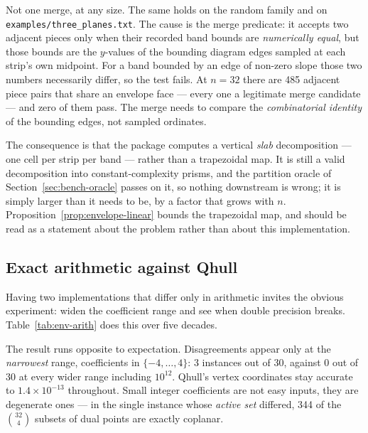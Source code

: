 \documentclass[11pt]{article}
\begin{document}
Not one merge, at any size.  The same holds on the random family and on
\texttt{examples/three\_planes.txt}.  The cause is the merge predicate: it
accepts two adjacent pieces only when their recorded band bounds are
\emph{numerically equal}, but those bounds are the $y$-values of the bounding
diagram edges sampled at each strip's own midpoint.  For a band bounded by an
edge of non-zero slope those two numbers necessarily differ, so the test fails.
At $n = 32$ there are 485 adjacent piece pairs that share an envelope face ---
every one a legitimate merge candidate --- and zero of them pass.  The merge
needs to compare the \emph{combinatorial identity} of the bounding edges, not
sampled ordinates.

The consequence is that the package computes a vertical \emph{slab}
decomposition --- one cell per strip per band --- rather than a trapezoidal map.
It is still a valid decomposition into constant-complexity prisms, and the
partition oracle of Section~\ref{sec:bench-oracle} passes on it, so nothing
downstream is wrong; it is simply larger than it needs to be, by a factor that
grows with $n$.  Proposition~\ref{prop:envelope-linear} bounds the trapezoidal
map, and should be read as a statement about the problem rather than about this
implementation.

\subsection{Exact arithmetic against Qhull}
\label{sec:bench-arith}

Having two implementations that differ only in arithmetic invites the obvious
experiment: widen the coefficient range and see when double precision breaks.
Table~\ref{tab:env-arith} does this over five decades.

The result runs opposite to expectation.  Disagreements appear only at the
\emph{narrowest} range, coefficients in $\{-4,\dots,4\}$: 3 instances out of 30,
against 0 out of 30 at every wider range including $10^{12}$.  Qhull's vertex
coordinates stay accurate to $1.4 \times 10^{-13}$ throughout.  Small integer
coefficients are not easy inputs, they are degenerate ones --- in the single
instance whose \emph{active set} differed, 344 of the $\binom{32}{4}$ subsets of
dual points are exactly coplanar.
\end{document}
